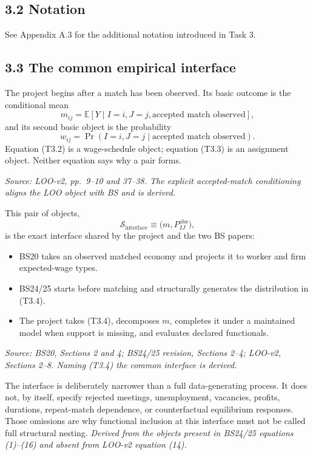 \documentclass[11pt]{article}
\begin{document}
\subsection{3.2 Notation}

See Appendix A.3 for the additional notation introduced in Task 3.

\subsection{3.3 The common empirical interface}

The project begins after a match has been observed.  Its basic outcome is the
conditional mean
\[
m_{ij}
=
\mathbb E[
  Y\mid I=i,J=j,\text{accepted match observed}
],
\tag{T3.2}
\]
and its second basic object is the probability
\[
w_{ij}
=
\Pr(I=i,J=j\mid\text{accepted match observed}).
\tag{T3.3}
\]
Equation (T3.2) is a wage-schedule object; equation (T3.3) is an assignment
object.  Neither equation says why a pair forms.

\textit{Source: LOO-v2, pp.\ 9--10 and 37--38.  The explicit
accepted-match conditioning aligns the LOO object with BS and is derived.}

This pair of objects,
\[
\mathcal S_{\mathrm{interface}}
\equiv
\bigl(m,P^{\mathrm{obs}}_{IJ}\bigr),
\tag{T3.4}
\]
is the exact interface shared by the project and the two BS papers:

\begin{itemize}
\item BS20 takes an observed matched economy and projects it to worker and firm
  expected-wage types.
\item BS24/25 starts before matching and structurally generates the
  distribution in (T3.4).
\item The project takes (T3.4), decomposes \(m\), completes it under a
  maintained model when support is missing, and evaluates declared
  functionals.
\end{itemize}

\textit{Source: BS20, Sections 2 and 4; BS24/25 revision, Sections 2--4;
LOO-v2, Sections 2--8.  Naming (T3.4) the common interface is derived.}

The interface is deliberately narrower than a full data-generating process.
It does not, by itself, specify rejected meetings, unemployment, vacancies,
profits, durations, repeat-match dependence, or counterfactual equilibrium
responses.  Those omissions are why functional inclusion at this interface
must not be called full structural nesting.
\textit{Derived from the objects present in BS24/25 equations (1)--(16) and
absent from LOO-v2 equation (14).}
\end{document}
